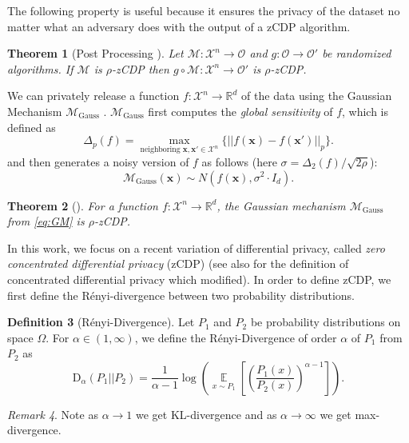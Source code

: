 \documentclass[twoside,letterpaper]{article} \usepackage{aistats2017}
\newtheorem{theorem}{Theorem}[section]
\theoremstyle{definition}
\newtheorem{definition}[theorem]{Definition}
\theoremstyle{remark}
\newtheorem{remark}[theorem]{Remark}
\begin{document}
The following property is useful because it ensures the privacy of the dataset no matter what an adversary does with the output of a zCDP algorithm.
\begin{theorem}[Post Processing \citep{BS16}]\label{thm:post}
Let ${\mathcal{M}}: {\mathcal{X}}^n \to {\mathcal{O}}$ and $g: {\mathcal{O}} \to {\mathcal{O}}'$ be randomized algorithms.  If ${\mathcal{M}}$ is $\rho$-zCDP then $g \circ {\mathcal{M}}: {\mathcal{X}}^n \to {\mathcal{O}}'$ is $\rho$-zCDP.  
\end{theorem}

We can privately release a function $f: {\mathcal{X}}^n \to {\mathbb{R}}^d$ of the data using the Gaussian Mechanism ${{\mathcal{M}}_{\text{Gauss}}}$ \cite{DKMMN06}. ${{\mathcal{M}}_{\text{Gauss}}}$ first computes the \emph{global sensitivity} of $f$, which is defined as 
$$
\Delta_p(f) = \max_{\text{neighboring } {\mathbf{x}}, {\mathbf{x}}' \in {\mathcal{X}}^n }\{ ||f({\mathbf{x}}) - f({\mathbf{x}}') ||_p\}.
$$
and then generates a noisy version of $f$ as follows (here $\sigma=\Delta_2(f)/\sqrt{2\rho}$):
\begin{equation}
{{\mathcal{M}}_{\text{Gauss}}}({\mathbf{x}}) \sim N(f({\mathbf{x}}),\sigma^2 \cdot I_d).
\label{eq:GM}
\end{equation}

\begin{theorem}[\cite{BS16}]
For a function $f: {\mathcal{X}}^n \to {\mathbb{R}}^d$, the Gaussian mechanism ${{\mathcal{M}}_{\text{Gauss}}}$ from \eqref{eq:GM} is $\rho$-zCDP.
\label{thm:gauss_mech}
\end{theorem}
\else
In this work, we focus on a recent variation of differential privacy, called \emph{zero concentrated differential privacy} (zCDP) \cite{BS16} (see also \cite{DR16} for the definition of concentrated differential privacy which \cite{BS16} modified).  In order to define zCDP, we first define the R\'{e}nyi-divergence between two probability distributions.
\begin{definition}[R\'{e}nyi-Divergence]
Let $P_1$ and $P_2$ be probability distributions on space $\Omega$.  For $\alpha \in (1,\infty)$, we define the R\'{e}nyi-Divergence of order $\alpha$ of $P_1$ from $P_2$ as 
$$
{\text{D}_{{\alpha}}\left({P_1}||{P_2} \right)} = \frac{1}{\alpha-1} \log\left( {\operatorname*{\mathbb{E}}_{{x \sim P_1}}\left[{\left( \frac{P_1(x)}{P_2(x)}\right)^{\alpha-1}}\right]}\right).
$$
\end{definition}
\begin{remark}
Note as $\alpha \to 1$ we get KL-divergence and as $\alpha \to \infty$ we get max-divergence.
\end{remark}
\end{document}
